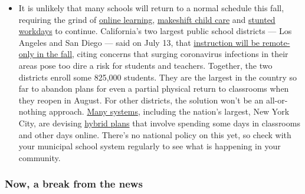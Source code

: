 \begin{itemize}
  \begin{itemize}
  \tightlist
  \item
    It is unlikely that many schools will return to a normal schedule
    this fall, requiring the grind of
    \href{https://www.nytimes.com/2020/06/05/us/coronavirus-education-lost-learning.html?action=click\&pgtype=Article\&state=default\&region=MAIN_CONTENT_3\&context=storylines_faq}{online
    learning},
    \href{https://www.nytimes.com/2020/05/29/us/coronavirus-child-care-centers.html?action=click\&pgtype=Article\&state=default\&region=MAIN_CONTENT_3\&context=storylines_faq}{makeshift
    child care} and
    \href{https://www.nytimes.com/2020/06/03/business/economy/coronavirus-working-women.html?action=click\&pgtype=Article\&state=default\&region=MAIN_CONTENT_3\&context=storylines_faq}{stunted
    workdays} to continue. California's two largest public school
    districts --- Los Angeles and San Diego --- said on July 13, that
    \href{https://www.nytimes.com/2020/07/13/us/lausd-san-diego-school-reopening.html?action=click\&pgtype=Article\&state=default\&region=MAIN_CONTENT_3\&context=storylines_faq}{instruction
    will be remote-only in the fall}, citing concerns that surging
    coronavirus infections in their areas pose too dire a risk for
    students and teachers. Together, the two districts enroll some
    825,000 students. They are the largest in the country so far to
    abandon plans for even a partial physical return to classrooms when
    they reopen in August. For other districts, the solution won't be an
    all-or-nothing approach.
    \href{https://bioethics.jhu.edu/research-and-outreach/projects/eschool-initiative/school-policy-tracker/}{Many
    systems}, including the nation's largest, New York City, are
    devising
    \href{https://www.nytimes.com/2020/06/26/us/coronavirus-schools-reopen-fall.html?action=click\&pgtype=Article\&state=default\&region=MAIN_CONTENT_3\&context=storylines_faq}{hybrid
    plans} that involve spending some days in classrooms and other days
    online. There's no national policy on this yet, so check with your
    municipal school system regularly to see what is happening in your
    community.
  \end{itemize}
\end{itemize}

\hypertarget{now-a-break-from-the-news}{%
\subsubsection{Now, a break from the
news}\label{now-a-break-from-the-news}}

